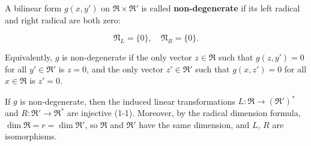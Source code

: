 A bilinear form $g(x, y')$ on $\mathfrak{R} \times \mathfrak{R}'$ is called \textbf{non-degenerate} if its left radical and right radical are both zero:

$$\mathfrak{N}_L = \{0\}, \quad \mathfrak{N}_R = \{0\}.$$

Equivalently, $g$ is non-degenerate if the only vector $z \in \mathfrak{R}$ such that $g(z, y') = 0$ for all $y' \in \mathfrak{R}'$ is $z = 0$, and the only vector $z' \in \mathfrak{R}'$ such that $g(x, z') = 0$ for all $x \in \mathfrak{R}$ is $z' = 0$.

If $g$ is non-degenerate, then the induced linear transformations $L: \mathfrak{R} \to (\mathfrak{R}')^*$ and $R: \mathfrak{R}' \to \mathfrak{R}^*$ are injective (1-1). Moreover, by the radical dimension formula, $\dim \mathfrak{R} = r = \dim \mathfrak{R}'$, so $\mathfrak{R}$ and $\mathfrak{R}'$ have the same dimension, and $L$, $R$ are isomorphisms.
